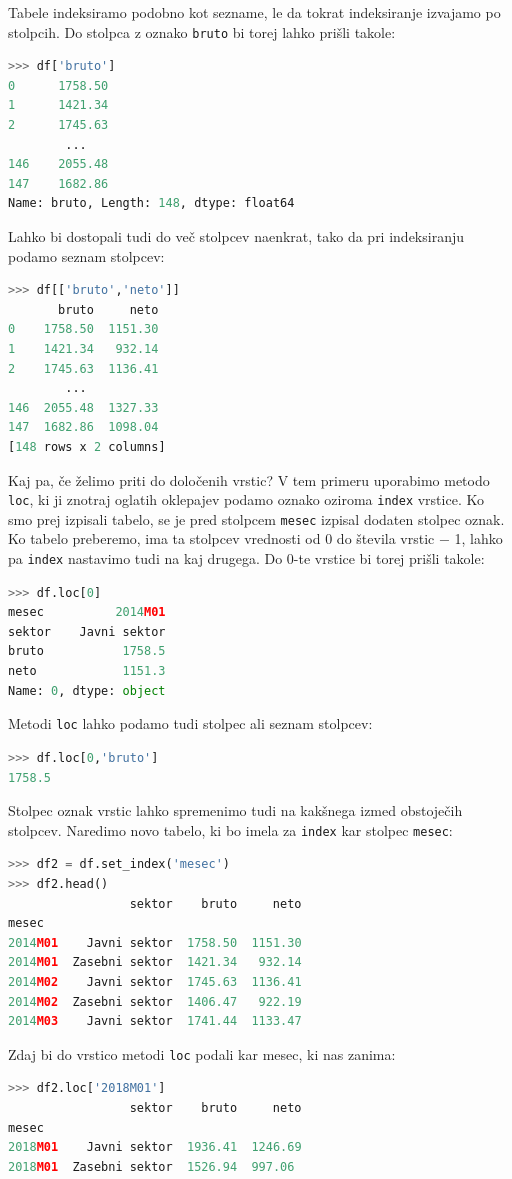 Tabele indeksiramo podobno kot sezname, le da tokrat indeksiranje izvajamo po stolpcih. Do stolpca z oznako  \texttt{bruto} bi torej lahko prišli takole:
\begin{lstlisting}[language=python]
>>> df['bruto']
0      1758.50
1      1421.34
2      1745.63
        ...
146    2055.48
147    1682.86
Name: bruto, Length: 148, dtype: float64
\end{lstlisting}
Lahko bi dostopali tudi do več stolpcev naenkrat, tako da pri indeksiranju podamo seznam stolpcev:
\begin{lstlisting}[language=python]
>>> df[['bruto','neto']]
       bruto     neto
0    1758.50  1151.30
1    1421.34   932.14
2    1745.63  1136.41
        ...
146  2055.48  1327.33
147  1682.86  1098.04
[148 rows x 2 columns]
\end{lstlisting}

Kaj pa, če želimo priti do določenih vrstic? V tem primeru uporabimo metodo \texttt{loc}, ki ji znotraj oglatih oklepajev podamo oznako oziroma \texttt{index} vrstice. Ko smo prej izpisali tabelo, se je pred stolpcem \texttt{mesec} izpisal dodaten stolpec oznak. Ko tabelo preberemo, ima ta stolpcev vrednosti od 0 do števila vrstic $-$ 1, lahko pa \texttt{index} nastavimo tudi na kaj drugega. Do 0-te vrstice bi torej prišli takole:
\begin{lstlisting}[language=python]
>>> df.loc[0]
mesec          2014M01
sektor    Javni sektor
bruto           1758.5
neto            1151.3
Name: 0, dtype: object
\end{lstlisting}
Metodi \texttt{loc} lahko podamo tudi stolpec ali seznam stolpcev:
\begin{lstlisting}[language=python]
>>> df.loc[0,'bruto']
1758.5
\end{lstlisting}
Stolpec oznak vrstic lahko spremenimo tudi na kakšnega izmed obstoječih stolpcev. Naredimo novo tabelo, ki bo imela za \texttt{index} kar stolpec \texttt{mesec}:
\begin{lstlisting}[language=python]
>>> df2 = df.set_index('mesec')
>>> df2.head()
                 sektor    bruto     neto
mesec                                    
2014M01    Javni sektor  1758.50  1151.30
2014M01  Zasebni sektor  1421.34   932.14
2014M02    Javni sektor  1745.63  1136.41
2014M02  Zasebni sektor  1406.47   922.19
2014M03    Javni sektor  1741.44  1133.47
\end{lstlisting}
Zdaj bi do vrstico metodi \texttt{loc} podali kar mesec, ki nas zanima:
\begin{lstlisting}[language=python]
>>> df2.loc['2018M01']
                 sektor    bruto     neto
mesec                                    
2018M01    Javni sektor  1936.41  1246.69
2018M01  Zasebni sektor  1526.94  997.06
\end{lstlisting}

